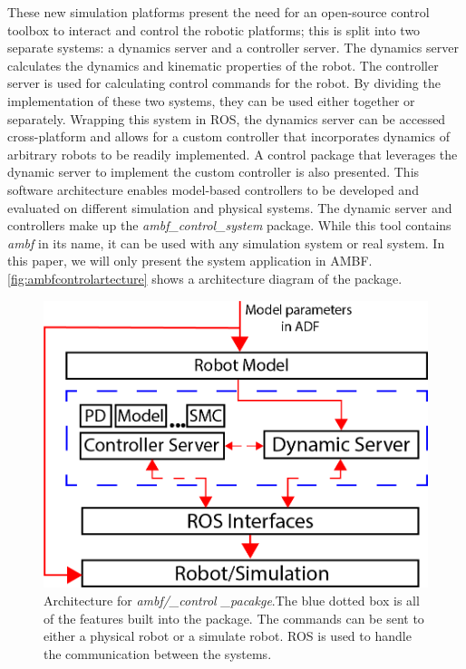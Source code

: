 These new simulation platforms present the need for an open-source control toolbox to interact and control the robotic platforms; this is split into two separate systems: a dynamics server and a controller server. The dynamics server calculates the dynamics and kinematic properties of the robot. The controller server is used for calculating control commands for the robot. By dividing the implementation of these two systems, they can be used either together or separately. Wrapping this system in ROS, the dynamics server can be accessed cross-platform and allows for a custom controller that incorporates dynamics of arbitrary robots to be readily implemented. A control package that leverages the dynamic server to implement the custom controller is also presented. This software architecture enables model-based controllers to be developed and evaluated on different simulation and physical systems. The dynamic server and controllers make up the \textit{ambf\_control\_system} package. While this tool contains \textit{ambf} in its name, it can be used with any simulation system or real system. In this paper, we will only present the system application in AMBF. \autoref{fig:ambfcontrolartecture} shows a architecture diagram of the package. 
 

 

 \begin{figure}
     \centering
     \includegraphics[scale=1.5]{images/software/dynamic_server_daigram.png}
     \caption[Controller package Diagram]{Architecture for \textit{ambf/_control
     _pacakge}.The blue dotted box is all of the features built into the package. The commands can be sent to either a physical robot or a simulate robot. ROS is used to handle the communication between the systems.}
     \label{fig:ambfcontrolartecture}
 \end{figure}
 
